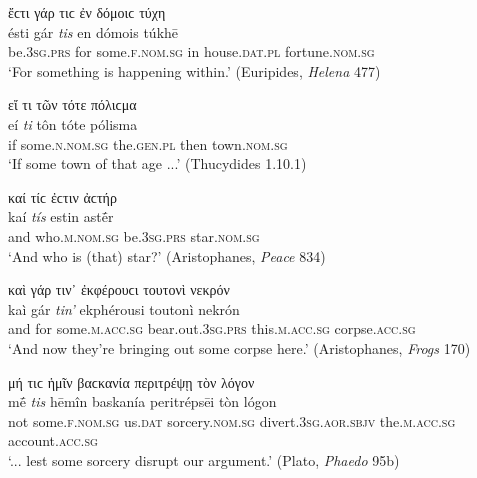 \begin{exe}
\ex ἔϲτι γάρ τιϲ ἐν δόμοιϲ τύχη\\
\gll ésti gár \emph{tis} en dómois túkhē\\
be.\textsc{3sg.prs} for some.\textsc{f.nom.sg} in house.\textsc{dat.pl} fortune.\textsc{nom.sg}\\
\trans `For something is happening within.' (Euripides, \textit{Helena} 477)
\label{tis20}
\end{exe}

\begin{exe}
\ex εἴ τι τῶν τότε πόλιϲμα\\
\gll eí \emph{ti} tôn tóte pólisma\\
if some.\textsc{n.nom.sg} the.\textsc{gen.pl} then town.\textsc{nom.sg}\\
\trans `If some town of that age ...' (Thucydides 1.10.1)
\label{tis21}
\end{exe}

\begin{exe}
\ex καί τίϲ ἐϲτιν ἀϲτήρ\\
\gll kaí \emph{tís} estin astḗr\\
and who.\textsc{m.nom.sg} be.\textsc{3sg.prs} star.\textsc{nom.sg}\\
\trans `And who is (that) star?' (Aristophanes, \textit{Peace} 834)
\label{tis22}
\end{exe}

\begin{exe}
\ex καὶ γάρ τιν᾽ ἐκφέρουϲι τουτονὶ νεκρόν\\
\gll kaì gár \emph{tin'} ekphérousi toutonì nekrón\\
and for some.\textsc{m.acc.sg} bear.out.\textsc{3sg.prs} this.\textsc{m.acc.sg} corpse.\textsc{acc.sg}\\
\trans `And now they're bringing out some corpse here.' (Aristophanes, \textit{Frogs} 170)
\label{tis23}
\end{exe}

\begin{exe}
\ex μή τιϲ ἡμῖν βαϲκανία περιτρέψῃ τὸν λόγον\\
\gll mḗ \emph{tis} hēmîn baskanía peritrépsēi tòn lógon\\
not some.\textsc{f.nom.sg} us.\textsc{dat} sorcery.\textsc{nom.sg} divert.\textsc{3sg.aor.sbjv} the.\textsc{m.acc.sg} account.\textsc{acc.sg}\\
\trans `... lest some sorcery disrupt our argument.' (Plato, \textit{Phaedo} 95b)
\label{tis24}
\end{exe}

